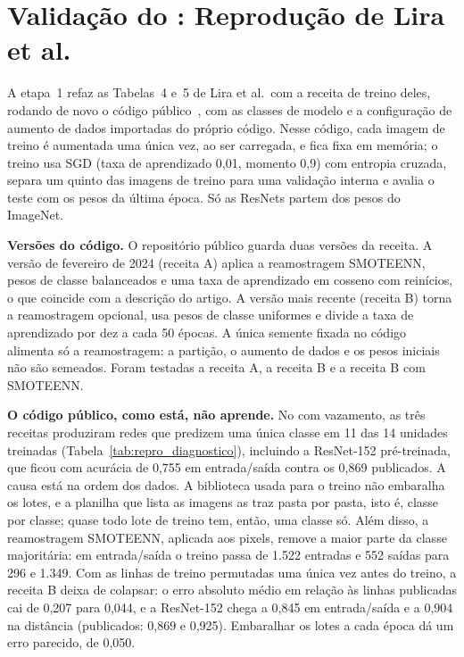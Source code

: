 \section{Validação do \texorpdfstring{}{Baseline}: Reprodução de Lira et al.}
\label{sec:repro_setup}

A etapa~1 refaz as Tabelas~4 e~5 de Lira et al.\ com a receita de treino deles, rodando de novo o código público~\cite{leguwoi}, com as classes de modelo e a configuração de aumento de dados importadas do próprio código. Nesse código, cada imagem de treino é aumentada uma única vez, ao ser carregada, e fica fixa em memória; o treino usa \gls{SGD} (taxa de aprendizado 0,01, momento 0,9) com entropia cruzada, separa um quinto das imagens de treino para uma validação interna e avalia o teste com os pesos da última época. Só as ResNets partem dos pesos do ImageNet.

\textbf{Versões do código.} O repositório público guarda duas versões da receita. A versão de fevereiro de 2024 (receita A) aplica a reamostragem \gls{SMOTEENN}, pesos de classe balanceados e uma taxa de aprendizado em cosseno com reinícios, o que coincide com a descrição do artigo. A versão mais recente (receita B) torna a reamostragem opcional, usa pesos de classe uniformes e divide a taxa de aprendizado por dez a cada 50 épocas. A única semente fixada no código alimenta só a reamostragem: a partição, o aumento de dados e os pesos iniciais não são semeados. Foram testadas a receita A, a receita B e a receita B com SMOTEENN.

\textbf{O código público, como está, não aprende.} No  com vazamento, as três receitas produziram redes que predizem uma única classe em 11 das 14 unidades treinadas (Tabela~\ref{tab:repro_diagnostico}), incluindo a ResNet-152 pré-treinada, que ficou com acurácia de 0,755 em entrada/saída contra os 0,869 publicados. A causa está na ordem dos dados. A biblioteca usada para o treino não embaralha os lotes, e a planilha que lista as imagens as traz pasta por pasta, isto é, classe por classe; quase todo lote de treino tem, então, uma classe só. Além disso, a reamostragem SMOTEENN, aplicada aos pixels, remove a maior parte da classe majoritária: em entrada/saída o treino passa de 1.522 entradas e 552 saídas para 296 e 1.349. Com as linhas de treino permutadas uma única vez antes do treino, a receita B deixa de colapsar: o erro absoluto médio em relação às linhas publicadas cai de 0,207 para 0,044, e a ResNet-152 chega a 0,845 em entrada/saída e a 0,904 na distância (publicados: 0,869 e 0,925). Embaralhar os lotes a cada época dá um erro parecido, de 0,050.

